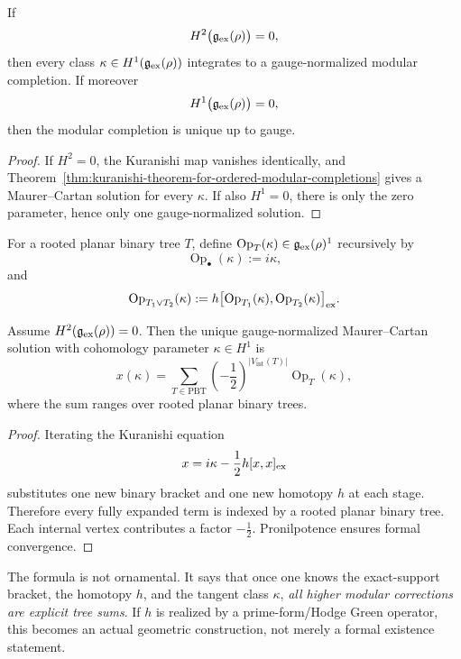 \begin{corollary}
\label{cor:unobstructed-regime}
If
\[
H^2\bigl(\mathfrak g_{\mathrm{ex}}(\rho)\bigr)=0,
\]
then every class $\kappa\in H^1(\mathfrak g_{\mathrm{ex}}(\rho))$ integrates to a gauge-normalized
modular completion. If moreover
\[
H^1\bigl(\mathfrak g_{\mathrm{ex}}(\rho)\bigr)=0,
\]
then the modular completion is unique up to gauge.
\end{corollary}

\begin{proof}
If $H^2=0$, the Kuranishi map vanishes identically, and
Theorem~\ref{thm:kuranishi-theorem-for-ordered-modular-completions} gives a Maurer--Cartan solution
for every $\kappa$. If also $H^1=0$, there is only the zero parameter, hence only one gauge-normalized
solution.
\end{proof}

\begin{definition}
\label{def:planar-binary-tree-operators}
For a rooted planar binary tree $T$, define $\operatorname{Op}_T(\kappa)\in\mathfrak g_{\mathrm{ex}}(\rho)^1$
recursively by
\[
\operatorname{Op}_{\bullet}(\kappa):=i\kappa,
\]
and
\[
\operatorname{Op}_{T_1\vee T_2}(\kappa)
:=
h\bigl[\operatorname{Op}_{T_1}(\kappa),\operatorname{Op}_{T_2}(\kappa)\bigr]_{\mathrm{ex}}.
\]
\end{definition}

\begin{theorem}
\label{thm:canonical-planar-tree-expansion}
Assume $H^2(\mathfrak g_{\mathrm{ex}}(\rho))=0$.
Then the unique gauge-normalized Maurer--Cartan solution with cohomology parameter
$\kappa\in H^1$ is
\[
x(\kappa)
=
\sum_{T\in \mathrm{PBT}}
\left(-\frac12\right)^{|V_{\mathrm{int}}(T)|}
\operatorname{Op}_T(\kappa),
\]
where the sum ranges over rooted planar binary trees.
\end{theorem}

\begin{proof}
Iterating the Kuranishi equation
\[
x=i\kappa-\frac12 h[x,x]_{\mathrm{ex}}
\]
substitutes one new binary bracket and one new homotopy $h$ at each stage. Therefore every fully expanded
term is indexed by a rooted planar binary tree. Each internal vertex contributes a factor $-\tfrac12$.
Pronilpotence ensures formal convergence.
\end{proof}

\begin{remark}
The formula is not ornamental. It says that once one knows the exact-support bracket, the homotopy $h$,
and the tangent class $\kappa$, \emph{all higher modular corrections are explicit tree sums}.
If $h$ is realized by a prime-form/Hodge Green operator, this becomes an actual geometric construction,
not merely a formal existence statement.
\end{remark}

